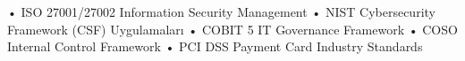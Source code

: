 • ISO 27001/27002 Information Security Management
• NIST Cybersecurity Framework (CSF) Uygulamaları
• COBIT 5 IT Governance Framework
• COSO Internal Control Framework
• PCI DSS Payment Card Industry Standards
